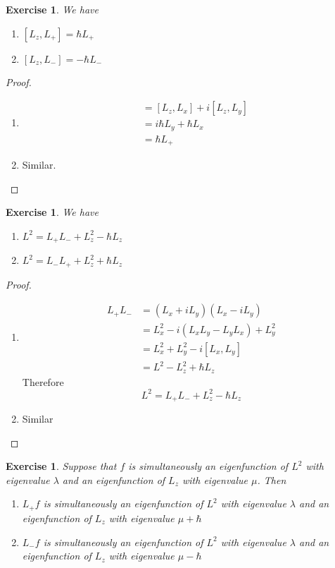 \documentclass[12pt]{amsart}
\newtheorem{ex}[thm]{Exercise}
\newcommand{\lam}{\lambda}
\begin{document}
\begin{ex} We have 
\begin{enumerate}
\item $[L_z,L_+] = \hbar L_+$
\item $[L_z, L_-] = -\hbar L_-$
\end{enumerate}
\end{ex}

\begin{proof}\
\begin{enumerate}
\item 
\begin{align*}
[L_z,L_+] 
&= [L_z,L_x]+i[L_z,L_y]\\
&= i \hbar L_y + \hbar L_x\\
&= \hbar L_+
\end{align*}

\item Similar.
\end{enumerate}
\end{proof}

\begin{ex} We have
\begin{enumerate}
\item $L^2 = L_+L_- + L_z^2 - \hbar L_z$ 
\item $L^2 = L_-L_+ + L_z^2 + \hbar L_z$
\end{enumerate}
\end{ex}

\begin{proof}\
\begin{enumerate}
\item \begin{align*}
L_+L_- 
&= (L_x + i L_y)(L_x - iL_y)\\
&= L_x^2 - i(L_xL_y - L_y L_x) + L_y^2\\
&= L_x^2 + L_y^2 - i[L_x, L_y]\\
&= L^2 - L_z^2  + \hbar L_z
\end{align*}
Therefore $$L^2 = L_+L_- + L_z^2 - \hbar L_z$$
\item Similar
\end{enumerate}
\end{proof}

\begin{ex}
Suppose that $f$ is simultaneously an eigenfunction of $L^2$ with eigenvalue $\lam$ and an eigenfunction of $L_z$ with eigenvalue $\mu$. Then 
\begin{enumerate}
\item $L_+f$ is simultaneously an eigenfunction of $L^2$ with eigenvalue $\lam$ and an eigenfunction of $L_z$ with eigenvalue $\mu + \hbar$
\item  $L_-f$ is simultaneously an eigenfunction of $L^2$ with eigenvalue $\lam$ and an eigenfunction of $L_z$ with eigenvalue $ \mu - \hbar$
\end{enumerate}
\end{ex}
\end{document}
